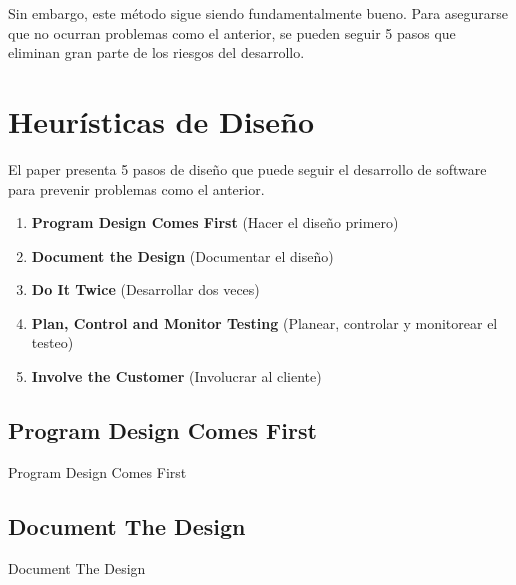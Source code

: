 \documentclass{beamer}
\begin{document}
\begin{frame}[fragile]

Sin embargo, este método sigue siendo fundamentalmente bueno. Para asegurarse que no ocurran problemas como el anterior, se pueden seguir 5 pasos que eliminan gran parte de los riesgos del desarrollo.

\end{frame}

\section{Heurísticas de Diseño}

\begin{frame}
El paper presenta 5 pasos de diseño que puede seguir el desarrollo de software para prevenir problemas como el anterior.

\begin{enumerate}
\item<2-> \textbf{Program Design Comes First} (Hacer el diseño primero)
\item<3-> \textbf{Document the Design} (Documentar el diseño)
\item<4-> \textbf{Do It Twice} (Desarrollar dos veces)
\item<5-> \textbf{Plan, Control and Monitor Testing} (Planear, controlar y monitorear el testeo)
\item<6-> \textbf{Involve the Customer} (Involucrar al cliente)
\end{enumerate}

\end{frame}

\subsection{Program Design Comes First}

\begin{frame}{Program Design Comes First}

\end{frame}

\subsection{Document The Design}

\begin{frame}{Document The Design}

\end{frame}
\end{document}
